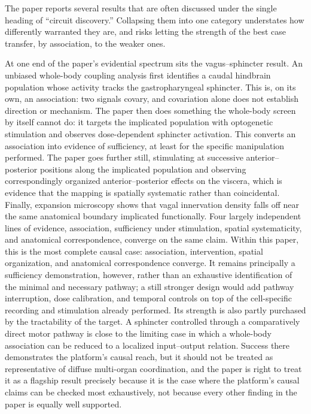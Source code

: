 \documentclass[11pt]{article}
\begin{document}
The paper reports several results that are often discussed under the single heading of ``circuit discovery.'' Collapsing them into one category understates how differently warranted they are, and risks letting the strength of the best case transfer, by association, to the weaker ones.

At one end of the paper's evidential spectrum sits the vagus--sphincter result. An unbiased whole-body coupling analysis first identifies a caudal hindbrain population whose activity tracks the gastropharyngeal sphincter. This is, on its own, an association: two signals covary, and covariation alone does not establish direction or mechanism. The paper then does something the whole-body screen by itself cannot do: it targets the implicated population with optogenetic stimulation and observes dose-dependent sphincter activation. This converts an association into evidence of sufficiency, at least for the specific manipulation performed. The paper goes further still, stimulating at successive anterior--posterior positions along the implicated population and observing correspondingly organized anterior--posterior effects on the viscera, which is evidence that the mapping is spatially systematic rather than coincidental. Finally, expansion microscopy shows that vagal innervation density falls off near the same anatomical boundary implicated functionally. Four largely independent lines of evidence, association, sufficiency under stimulation, spatial systematicity, and anatomical correspondence, converge on the same claim. Within this paper, this is the most complete causal case: association, intervention, spatial organization, and anatomical correspondence converge. It remains principally a sufficiency demonstration, however, rather than an exhaustive identification of the minimal and necessary pathway; a still stronger design would add pathway interruption, dose calibration, and temporal controls on top of the cell-specific recording and stimulation already performed. Its strength is also partly purchased by the tractability of the target. A sphincter controlled through a comparatively direct motor pathway is close to the limiting case in which a whole-body association can be reduced to a localized input--output relation. Success there demonstrates the platform's causal reach, but it should not be treated as representative of diffuse multi-organ coordination, and the paper is right to treat it as a flagship result precisely because it is the case where the platform's causal claims can be checked most exhaustively, not because every other finding in the paper is equally well supported.
\end{document}
